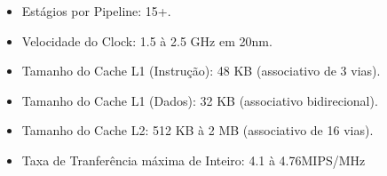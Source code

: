 \documentclass[12pt,a4paper,utf8]{ppgsi}
\begin{document}
        \begin{itemize}
            \item Estágios por Pipeline: 15+.
        \end{itemize}
        \begin{itemize}
            \item Velocidade do Clock: 1.5 à 2.5 GHz em 20nm.
        \end{itemize}
        \begin{itemize}
            \item Tamanho do Cache L1 (Instrução): 48 KB (associativo de 3 vias).
        \end{itemize}
        \begin{itemize}
            \item Tamanho do Cache L1 (Dados): 32 KB (associativo bidirecional).
        \end{itemize}
        \begin{itemize}
            \item Tamanho do Cache L2: 512 KB à 2 MB (associativo de 16 vias).
        \end{itemize}
        \begin{itemize}
            \item Taxa de Tranferência máxima de Inteiro: 4.1 à 4.76MIPS/MHz
        \end{itemize}     
    


\nocite{manual}
\nocite{pressreal}
\nocite{pressarmv86}
\nocite{pressSdragon}
\nocite{bench}
\nocite{atomclose}
\end{document}
